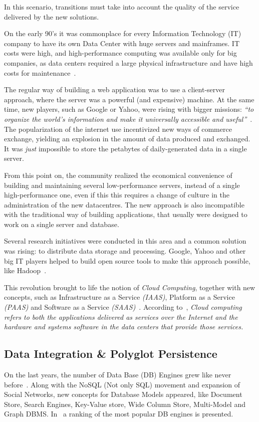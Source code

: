 \documentclass{article}
\begin{document}
In this scenario, transitions must take into account the quality of the service delivered by the new solutions.

On the early 90's it was commonplace for every Information Technology (IT) company to have its own Data Center with huge servers and mainframes. 
IT costs were high, and high-performance computing was available only for big companies, as data centers required a large physical infrastructure and have high costs for maintenance~\cite{Armbrust09m.:above}.

The regular way of building a web application was to use a client-server approach, where the server was a powerful (and expensive) machine. 
At the same time, new players, such as Google or Yahoo, were rising with bigger missions: \textit{``to organize the world's information and make it universally accessible and useful''}~\cite{Spector:2012:GHA:2209249.2209262}. 
The popularization of the internet use incentivized new ways of commerce exchange, yielding an explosion in the amount of data produced and exchanged. 
It was \textit{just} impossible to store the petabytes of daily-generated data in a single server. 

From this point on, the community realized the economical convenience of building and maintaining several low-performance servers, instead of a single high-performance one, even if this this requires a change of culture in the administration of the new datacentres.
The new approach is also incompatible with the traditional way of building applications, that usually were designed to work on a single server and database. 

Several research initiatives were conducted in this area and a common solution was rising: to distribute data storage and processing. 
Google, Yahoo and other big IT players helped to build open source tools to make this approach possible, like Hadoop~\cite{5496972}.

This revolution brought to life the notion of \textit{Cloud Computing}, together with new concepts, such as Infrastructure as a Service \textit{(IAAS)}, Platform as a Service \textit{(PAAS)} and Software as a Service \textit{(SAAS)}~\cite{AViewOfCloudComputing}.
According to~\cite{AViewOfCloudComputing}, \textit{Cloud computing refers to both the applications delivered as services over the Internet and the hardware and systems software in the data centers that provide those services.} 


\subsection{Data Integration \& Polyglot Persistence}
On the last years, the number of Data Base (DB) Engines grew like never before~\cite{dbranking}. 
Along with the NoSQL (Not only SQL) movement and expansion of Social Networks, new concepts for Database Models appeared, like Document Store, Search Engines, Key-Value store, Wide Column Store, Multi-Model and Graph DBMS. 
In~\cite{dbranking} a ranking of the most popular DB engines is presented.
\end{document}
